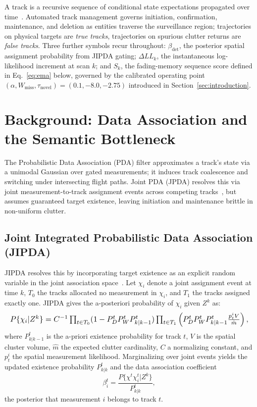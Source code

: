 \documentclass[conference]{IEEEtran}
\begin{document}
A track is a recursive sequence of conditional state expectations propagated over time~\cite{blackman_1986_multipletarget}. Automated track management governs initiation, confirmation, maintenance, and deletion as entities traverse the surveillance region; trajectories on physical targets are \emph{true tracks}, trajectories on spurious clutter returns are \emph{false tracks}. Three further symbols recur throughout: $\beta_{\text{det}}$, the posterior spatial assignment probability from JIPDA gating; $\Delta LL_k$, the instantaneous log-likelihood increment at scan $k$; and $S_k$, the fading-memory sequence score defined in Eq.~\eqref{eq:ema} below, governed by the calibrated operating point $(\alpha, W_{\text{miss}}, \tau_{\text{novel}}) = (0.1, -8.0, -2.75)$ introduced in Section~\ref{sec:introduction}.

\section{Background: Data Association and the Semantic Bottleneck}

The Probabilistic Data Association (PDA) filter approximates a track's state via a unimodal Gaussian over gated measurements; it induces track coalescence and switching under intersecting flight paths. Joint PDA (JPDA) resolves this via joint measurement-to-track assignment events across competing tracks~\cite{fortmann_1983_sonar, kuochuchang_1986_joint}, but assumes guaranteed target existence, leaving initiation and maintenance brittle in non-uniform clutter.

\subsection{Joint Integrated Probabilistic Data Association (JIPDA)}
JIPDA resolves this by incorporating target existence as an explicit random variable in the joint association space~\cite{musicki_2002_joint}. Let $\chi_i$ denote a joint assignment event at time $k$, $T_0$ the tracks allocated no measurement in $\chi_i$, and $T_1$ the tracks assigned exactly one. JIPDA gives the a-posteriori probability of $\chi_i$ given $Z^k$ as:
\begin{equation}
\resizebox{\linewidth}{!}{$
P\{\chi_i|Z^k\} = C^{-1} \prod_{t\in T_0} (1-P_D^t P_W^t P_{k|k-1}^t) \prod_{t\in T_1} \left(P_D^t P_W^t P_{k|k-1}^t \frac{p_t^i V}{\hat{m}}\right),
$}
\end{equation}
where $P_{k|k-1}^t$ is the a-priori existence probability for track $t$, $V$ is the spatial cluster volume, $\hat{m}$ the expected clutter cardinality, $C$ a normalizing constant, and $p_t^i$ the spatial measurement likelihood. Marginalizing over joint events yields the updated existence probability $P_{k|k}^t$ and the data association coefficient
\begin{equation}
\beta_i^t = \frac{P\{\chi^t \chi_i^t | Z^k\}}{P_{k|k}^t},
\end{equation}
the posterior that measurement $i$ belongs to track $t$.
\end{document}
